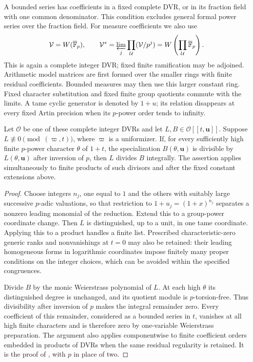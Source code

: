 A bounded series has coefficients in a fixed complete DVR, or in its
fraction field with one common denominator.  This condition excludes
general formal power series over the fraction field.  For measure
coefficients we also use
\[
 \mathcal V=W(\overline{\mathbb F}_p),\qquad
 \mathcal V^*=\varprojlim_j\prod_{\mathcal U}(\mathcal V/p^j)
 =W\left(\prod_{\mathcal U}\overline{\mathbb F}_p\right).
\]
This is again a complete integer DVR; fixed finite ramification may
be adjoined.  Arithmetic model matrices are first formed over the
smaller rings with finite residual coefficients.  Bounded measures
may then use this larger constant ring.  Fixed character substitution
and fixed finite group quotients commute with the limits.  A tame
cyclic generator is denoted by $1+u$; its relation disappears at every
fixed Artin precision when its $p$-power order tends to infinity.

\begin{lemma}\label{models:series-division}
Let $\mathcal O$ be one of these complete integer DVRs and let
$L,B\in\mathcal O[[t,\mathbf u]]$.  Suppose
$L\not\equiv0\pmod{(\varpi,t)}$, where $\varpi$ is a uniformizer.
If, for every sufficiently high finite $p$-power character $\theta$
of $1+t$, the specialization $B(\theta,\mathbf u)$ is divisible by
$L(\theta,\mathbf u)$ after inversion of $p$, then $L$ divides $B$
integrally.  The assertion applies simultaneously to finite products
of such divisors and after the fixed constant extensions above.
\end{lemma}

\begin{proof}
Choose integers $n_j$, one equal to $1$ and the others with suitably
large successive $p$-adic valuations, so that restriction to
$1+u_j=(1+x)^{n_j}$ separates a nonzero leading monomial of the
reduction.  Extend this to a group-power coordinate change.  Then
$L$ is distinguished, up to a unit, in one tame coordinate.
Applying this to a product handles a finite list.  Prescribed
characteristic-zero generic ranks and nonvanishings at $t=0$ may also
be retained: their leading homogeneous forms in logarithmic
coordinates impose finitely many proper conditions on the integer
choices, which can be avoided within the specified congruences.

Divide $B$ by the monic Weierstrass polynomial of $L$.  At each high
$\theta$ its distinguished degree is unchanged, and its quotient
module is $p$-torsion-free.  Thus divisibility after inversion of $p$
makes the integral remainder zero.  Every coefficient of this
remainder, considered as a bounded series in $t$, vanishes at all
high finite characters and is therefore zero by one-variable
Weierstrass preparation.  The argument also applies componentwise
to finite coefficient orders embedded in products of DVRs when the
same residual regularity is retained.  It is the proof of
\cite[Lemma 3.10]{B}, with $p$
in place of two.
\end{proof}

